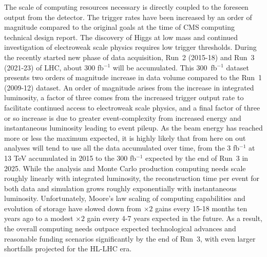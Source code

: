\documentclass[11pt,a4paper]{article}
\begin{document}
The scale of computing resources necessary is directly coupled to the
foreseen output from the detector.  The trigger rates have been increased
by an order of magnitude compared to the original goals at the time of CMS
computing technical design report. The discovery of Higgs at low mass and
continued investigation of electroweak scale physics requires low trigger
thresholds.  During the recently started new phase of data acquisition,
Run~2 (2015-18) and Run~3 (2021-23) of LHC, about 300 fb$^{-1}$ will be
accumulated. This 300~fb$^{-1}$ dataset presents two orders of magnitude
increase in data volume compared to the Run~1 (2009-12) dataset.  An order
of magnitude arises from the increase in integrated luminosity, a factor of
three comes from the increased trigger output rate to facilitate continued
access to electroweak scale physics, and a final factor of three or so
increase is due to greater event-complexity from increased energy and
instantaneous luminosity leading to event pileup.  As the beam energy has
reached more or less the maximum expected, it is highly likely that from
here on out analyses will tend to use all the data accumulated over time,
from the 3 fb$^{-1}$ at 13 TeV accumulated in 2015 to the 300 fb$^{-1}$
expected by the end of Run~3 in 2025.  
While the analysis and Monte Carlo
production computing needs scale roughly linearly with integrated
luminosity, the reconstruction time per event for both data and simulation
grows roughly exponentially with instantaneous luminosity.  Unfortunately,
Moore's law scaling of computing capabilities and evolution of storage have
slowed down from $\times 2$ gains every 15-18 months ten years ago to a
modest $\times 2$ gain every 4-7 years expected in the future.  As a
result, the overall computing needs outpace expected technological advances
and reasonable funding scenarios significantly by the end of Run~3, with even
larger shortfalls projected for the HL-LHC era.
\end{document}

